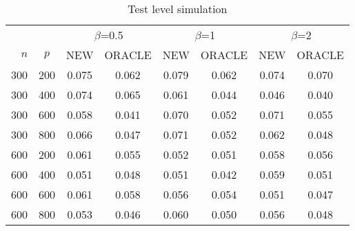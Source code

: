 \begin{table}[ht]

\caption{Test level simulation} 
\label{biaoge1}
    \vspace{3mm}
\centering
\begin{tabular}{rccccccc}
    \toprule
     &  & \multicolumn{2}{c}{$\beta$=0.5} & \multicolumn{2}{c}{$\beta$=1}& \multicolumn{2}{c}{$\beta$=2}   \\
    \cmidrule(r){3-4}
    \cmidrule(r){5-6}
    \cmidrule(r){7-8}
$n$ & $p$ & NEW & ORACLE & NEW & ORACLE & NEW & ORACLE \\ 
\midrule
300 & 200 & 0.075 & 0.062 & 0.079 & 0.062 & 0.074 & 0.070 \\ 
  300 & 400 & 0.074 & 0.065 & 0.061 & 0.044 & 0.046 & 0.040 \\ 
  300 & 600 & 0.058 & 0.041 & 0.070 & 0.052 & 0.071 & 0.055 \\ 
  300 & 800 & 0.066 & 0.047 & 0.071 & 0.052 & 0.062 & 0.048 \\ 
  600 & 200 & 0.061 & 0.055 & 0.052 & 0.051 & 0.058 & 0.056 \\ 
  600 & 400 & 0.051 & 0.048 & 0.051 & 0.042 & 0.059 & 0.051 \\ 
  600 & 600 & 0.061 & 0.058 & 0.056 & 0.054 & 0.051 & 0.047 \\ 
  600 & 800 & 0.053 & 0.046 & 0.060 & 0.050 & 0.056 & 0.048 \\ 
   \bottomrule
\end{tabular}
\end{table}
